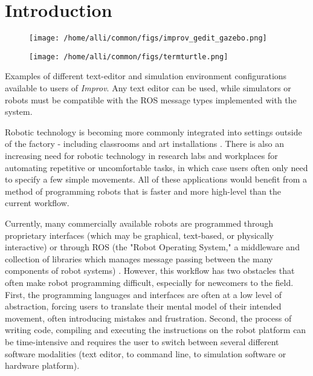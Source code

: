 \documentclass[sigchi-a]{acmart}
\begin{document}
\section{Introduction}\label{introduction}

\begin{marginfigure}
    \begin{subfigure}{0.45\textwidth}
        \texttt{[image: /home/alli/common/figs/improv\_gedit\_gazebo.png]}
    \end{subfigure}\hfill%
    \begin{subfigure}{0.45\textwidth}
        \texttt{[image: /home/alli/common/figs/termturtle.png]}
    \end{subfigure}
    \caption{Examples of different text-editor and simulation environment
configurations available to users of \emph{Improv}. Any text editor can be
used, while simulators or robots must be compatible with the ROS message types
implemented with the system.}
\end{marginfigure}

Robotic technology is becoming more commonly integrated into settings outside of
the factory - including classrooms \cite{mataric2004robotics} and art installations
\cite{kukaDance2017}. There
is also an increasing need for robotic technology in research labs and
workplaces for automating repetitive or uncomfortable tasks, in which case
users often only need to specify a few simple movements. All of
these applications would benefit from a method of programming robots that is
faster and more high-level than the current workflow.


Currently, many commercially available robots are programmed through proprietary
interfaces (which may be graphical, text-based, or physically interactive) or through ROS (the "Robot Operating System,"
a middleware and collection of libraries which manages message passing between
the many components of robot systems) \cite{rossano2013easy}
\cite{quigley2009ros}. However, this
workflow has two obstacles that often make robot programming difficult,
especially for newcomers to the field. First, the programming languages and
interfaces are
often at a low level of abstraction, forcing users to translate their
mental model of their intended movement, often introducing
mistakes and frustration. Second, the process of writing code, compiling and
executing the instructions on the robot platform can be time-intensive and
requires the user to switch between several different software modalities (text
editor, to command line, to simulation software or hardware platform).
\end{document}
